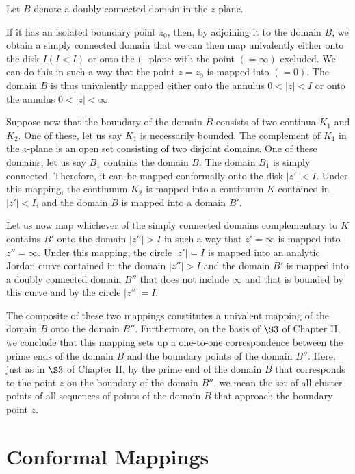 \documentclass[
]{book}
\theoremstyle{definition}
\theoremstyle{definition}
\theoremstyle{definition}
\theoremstyle{definition}
\theoremstyle{remark}
\begin{document}
Let \(B\) denote a doubly connected domain in the \(z\)-plane.

If it has an isolated boundary point \(z_0\), then, by adjoining it to the domain \(B\), we obtain a simply connected domain that we can then map univalently either onto the disk \(I (I < I)\) or onto the \((-\)plane with the point \((= \infty)\) excluded. We can do this in such a way that the point \(z = z_0\) is mapped into \((= 0)\). The domain \(B\) is thus univalently mapped either onto the annulus \(0 < |z| < I\) or onto the annulus \(0 < |z| < \infty\).

Suppose now that the boundary of the domain \(B\) consists of two continua \(K_1\) and \(K_2\). One of these, let us say \(K_1\) is necessarily bounded. The complement of \(K_1\) in the \(z\)-plane is an open set consisting of two disjoint domains. One of these domains, let us say \(B_1\) contains the domain \(B\). The domain \(B_1\) is simply connected. Therefore, it can be mapped conformally onto the disk \(|z'| < I\). Under this mapping, the continuum \(K_2\) is mapped into a continuum \(K\) contained in \(|z' | < I\), and the domain \(B\) is mapped into a domain \(B'\).

Let us now map whichever of the simply connected domains complementary to \(K\) contains \(B'\) onto the domain \(|z''| > I\) in such a way that \(z' = \infty\) is mapped into \(z'' = \infty\). Under this mapping, the circle \(|z'| = I\) is mapped into an analytic Jordan curve contained in the domain \(|z''| > I\) and the domain \(B'\) is mapped into a doubly connected domain \(B''\) that does not include \(\infty\) and that is bounded by this curve and by the circle \(|z''| = I\).

The composite of these two mappings constitutes a univalent mapping of the domain \(B\) onto the domain \(B''\). Furthermore, on the basis of \(\S 3\) of Chapter II, we conclude that this mapping sets up a one-to-one correspondence between the prime ends of the domain \(B\) and the boundary points of the domain \(B''\). Here, just as in \(\S 3\) of Chapter II, by the prime end of the domain \(B\) that corresponds to the point \(z\) on the boundary of the domain \(B''\), we mean the set of all cluster points of all sequences of points of the domain \(B\) that approach the boundary point \(z\).

\chapter{Conformal Mappings}\label{conformal-mappings}
\end{document}
